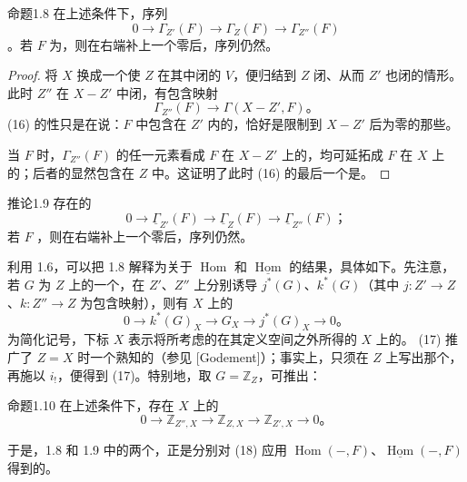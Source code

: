 \begin{SGAresult}{命题}{1.8}
在上述条件下，序列
\[
0\longrightarrow\Gamma_{Z'}(F)\longrightarrow\Gamma_Z(F)
\longrightarrow\Gamma_{Z''}(F)\tag{16}
\]
。若 $F$ 为，则在右端补上一个零后，序列仍然。
\end{SGAresult}
\begin{proof}
将 $X$ 换成一个使 $Z$ 在其中闭的 $V$，便归结到 $Z$ 闭、从而 $Z'$ 也闭的情形。此时 $Z''$ 在 $X-Z'$ 中闭，有包含映射
\[
\Gamma_{Z''}(F)\longrightarrow\Gamma(X-Z',F)。
\]
(16) 的性只是在说：$F$ 中包含在 $Z'$ 内的，恰好是限制到 $X-Z'$ 后为零的那些。

当 $F$ 时，$\Gamma_{Z''}(F)$ 的任一元素看成 $F$ 在 $X-Z'$ 上的，均可延拓成 $F$ 在 $X$ 上的；后者的显然包含在 $Z$ 中。这证明了此时 (16) 的最后一个是。
\end{proof}
\begin{SGAresult}{推论}{1.9}
存在的
\[
0\longrightarrow\underline{\Gamma}_{Z'}(F)
\longrightarrow\underline{\Gamma}_Z(F)
\longrightarrow\underline{\Gamma}_{Z''}(F)；\tag{16 bis}
\]
若 $F$ ，则在右端补上一个零后，序列仍然。
\end{SGAresult}
利用 1.6，可以把 1.8 解释为关于 $\operatorname{Hom}$ 和 $\underline{\operatorname{Hom}}$ 的结果，具体如下。先注意，若 $G$ 为 $Z$ 上的一个，在 $Z'$、$Z''$ 上分别诱导 $j^*(G)$、$k^*(G)$（其中 $j:Z'\to Z$、$k:Z''\to Z$ 为包含映射），则有 $X$ 上的
\[
0\longrightarrow k^*(G)_X\longrightarrow G_X
\longrightarrow j^*(G)_X\longrightarrow0。\tag{17}
\]
为简化记号，下标 $X$ 表示将所考虑的在其定义空间之外所得的 $X$ 上的。 (17) 推广了 $Z=X$ 时一个熟知的（参见 [Godement]）；事实上，只须在 $Z$ 上写出那个，再施以 $i_!$，便得到 (17)。特别地，取 $G=\mathbb Z_Z$，可推出：
\begin{SGAresult}{命题}{1.10}
在上述条件下，存在 $X$ 上的
\[
0\longrightarrow\mathbb Z_{Z'',X}\longrightarrow\mathbb Z_{Z,X}
\longrightarrow\mathbb Z_{Z',X}\longrightarrow0。\tag{18}
\]
\end{SGAresult}
于是，1.8 和 1.9 中的两个，正是分别对 (18) 应用 $\operatorname{Hom}(-,F)$、$\underline{\operatorname{Hom}}(-,F)$ 得到的。

